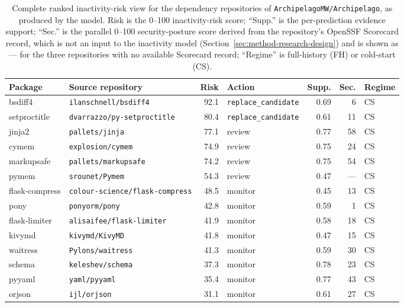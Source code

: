 \begin{table}[htbp]
  \centering
  \small
  \caption{Complete ranked inactivity-risk view for the dependency repositories of
  \texttt{ArchipelagoMW/Archipelago}, as produced by the model. Risk is
  the 0--100 inactivity-risk score; ``Supp.'' is the per-prediction evidence support;
  ``Sec.'' is the parallel 0--100 security-posture score derived from the
  repository's OpenSSF Scorecard record, which is not an input to the inactivity
  model (Section~\ref{sec:method-research-design}) and is shown as --- for the three
  repositories with no available Scorecard record; ``Regime'' is full-history (FH)
  or cold-start (CS).}
  \label{tab:demo-ranking-full}
  \footnotesize
  \setlength{\tabcolsep}{3.5pt}
  \begin{tabular}{llrlrrl}
    \toprule
    Package & Source repository & Risk & Action & Supp. & Sec. & Regime \\
    \midrule
    bsdiff4 & \texttt{ilanschnell/bsdiff4} & 92.1 & \texttt{replace\_candidate} & 0.69 & 6 & CS \\
    setproctitle & \texttt{dvarrazzo/py-setproctitle} & 80.4 & \texttt{replace\_candidate} & 0.61 & 11 & CS \\
    \midrule
    jinja2 & \texttt{pallets/jinja} & 77.1 & review & 0.77 & 58 & CS \\
    cymem & \texttt{explosion/cymem} & 74.9 & review & 0.75 & 24 & CS \\
    markupsafe & \texttt{pallets/markupsafe} & 74.2 & review & 0.75 & 54 & CS \\
    pymem & \texttt{srounet/Pymem} & 54.3 & review & 0.47 & --- & CS \\
    \midrule
    flask-compress & \texttt{colour-science/flask-compress} & 48.5 & monitor & 0.45 & 13 & CS \\
    pony & \texttt{ponyorm/pony} & 42.8 & monitor & 0.59 & 1 & CS \\
    flask-limiter & \texttt{alisaifee/flask-limiter} & 41.9 & monitor & 0.58 & 18 & CS \\
    kivymd & \texttt{kivymd/KivyMD} & 41.8 & monitor & 0.47 & 15 & CS \\
    waitress & \texttt{Pylons/waitress} & 41.3 & monitor & 0.59 & 30 & CS \\
    schema & \texttt{keleshev/schema} & 37.3 & monitor & 0.78 & 23 & CS \\
    pyyaml & \texttt{yaml/pyyaml} & 35.4 & monitor & 0.77 & 43 & CS \\
    orjson & \texttt{ijl/orjson} & 31.1 & monitor & 0.61 & 27 & CS \\

\end{tabular}
\end{table}
